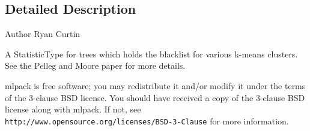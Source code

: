 \subsection{Detailed Description}
\begin{DoxyAuthor}{Author}
Ryan Curtin
\end{DoxyAuthor}
A Statistic\+Type for trees which holds the blacklist for various k-\/means clusters. See the Pelleg and Moore paper for more details.

mlpack is free software; you may redistribute it and/or modify it under the terms of the 3-\/clause B\+SD license. You should have received a copy of the 3-\/clause B\+SD license along with mlpack. If not, see {\tt http\+://www.\+opensource.\+org/licenses/\+B\+S\+D-\/3-\/\+Clause} for more information. 